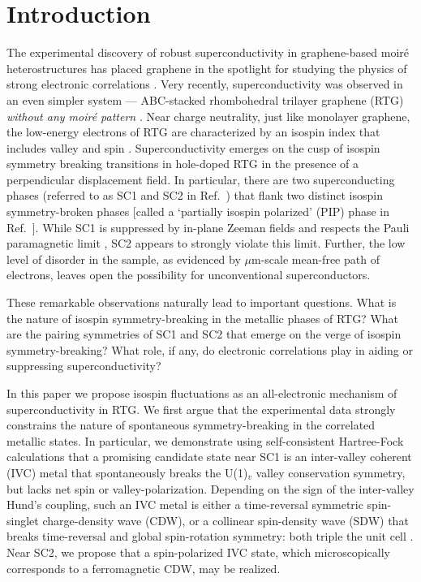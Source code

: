 \documentclass[aps,pra,twocolumn,superscriptaddress,10pt,article,nofootinbib,showpacs,longbibliography]{revtex4-1}
\begin{document}
\section{Introduction}
The experimental discovery of robust superconductivity in graphene-based moir\'e heterostructures has placed graphene in the  spotlight for studying the physics of strong electronic correlations \cite{cao2018,yankowitz2019,lu2019,Arora2020,hao2021,park2021,AndreiMacdonaldreview,balentsReview}. 
Very recently, superconductivity was observed in an even simpler system --- ABC-stacked rhombohedral trilayer graphene (RTG) \textit{without any moir\'e pattern} \cite{Zhou_ABCSC}.
Near charge neutrality, just like monolayer graphene, the low-energy electrons of RTG are characterized by an isospin index that includes valley and spin \cite{Zhang2010,Jung2013}.
Superconductivity emerges on the cusp of isospin symmetry breaking transitions in hole-doped RTG in the presence of a perpendicular displacement field.
In particular, there are two superconducting phases (referred to as SC1 and SC2 in Ref.~) that flank two distinct isospin symmetry-broken phases [called a `partially isospin polarized' (PIP) phase in Ref.~].
While SC1 is suppressed by in-plane Zeeman fields and respects the Pauli paramagnetic limit \cite{Chandrasekhar,Clogston}, SC2 appears to strongly violate this limit.
Further, the low level of disorder in the sample, as evidenced by $\mu$m-scale mean-free path of electrons, leaves open the possibility for unconventional superconductors.

These remarkable observations naturally lead to important questions.
What is the nature of isospin symmetry-breaking in the metallic phases of RTG?
What are the pairing symmetries of SC1 and SC2 that emerge on the verge of isospin symmetry-breaking?
What role, if any, do electronic correlations play in aiding or suppressing superconductivity?

In this paper we propose isospin fluctuations as an all-electronic mechanism of superconductivity in RTG.
We first argue that the experimental data strongly constrains the nature of spontaneous symmetry-breaking in the correlated metallic states.
In particular, we demonstrate using self-consistent Hartree-Fock calculations that a promising candidate state near SC1 is an inter-valley coherent (IVC) metal that spontaneously breaks the U(1)$_v$ valley conservation symmetry, but lacks net spin or valley-polarization. 
Depending on the sign of the inter-valley Hund's coupling, such an IVC metal is either a time-reversal symmetric spin-singlet charge-density wave (CDW), or a collinear spin-density wave (SDW) that breaks time-reversal and global spin-rotation symmetry: both triple the unit cell \cite{HalperinRice,Aleiner2007}.
Near SC2, we propose that a spin-polarized IVC state, which microscopically corresponds to a ferromagnetic CDW, may be realized. 
\end{document}
